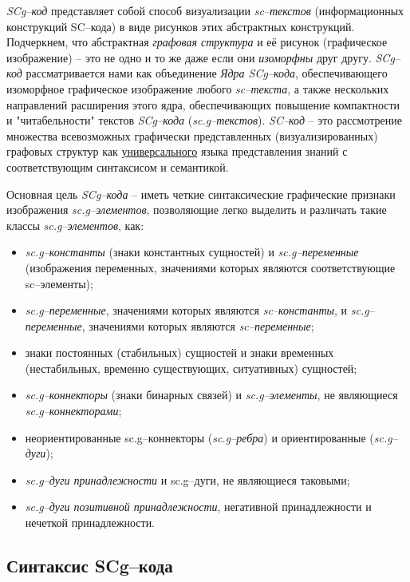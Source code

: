 \textit{SCg--код} представляет собой способ визуализации \textit{sc--текстов} (информационных конструкций SC--кода) в виде рисунков этих абстрактных конструкций. Подчеркнем, что абстрактная \textit{графовая структура} и её рисунок (графическое изображение) -- это не одно и то же даже если они \textit{изоморфны} друг другу. \mbox{\textit{SCg--код}} рассматривается нами как объединение \textit{Ядра SCg--кода}, обеспечивающего изоморфное графическое изображение любого \textit{sc--текста}, а также нескольких направлений расширения этого ядра, обеспечивающих повышение компактности и "читабельности"{} текстов \textit{SCg--кода} (\textit{sc.g--текстов}).
\textit{SC--код} -- это рассмотрение множества всевозможных графически представленных (визуализированных) графовых структур как \underline{универсального} языка представления знаний с соответствующим синтаксисом и семантикой.

Основная цель \textit{SCg--кода} – иметь четкие синтаксические графические признаки изображения \textit{sc.g--элементов}, позволяющие легко выделить и различать такие классы \textit{sc.g--элементов}, как:
\begin{itemize}
	\item \textit{sc.g--константы} (знаки константных сущностей) и \textit{sc.g--переменные} (изображения переменных, значениями которых являются соответствующие sc--элементы);
	\item \textit{sc.g--переменные}, значениями которых являются \textit{sc--константы}, и \textit{sc.g--переменные}, значениями которых являются \textit{sc--переменные};
	\item знаки постоянных (стабильных) сущностей и знаки временных (нестабильных, временно существующих, ситуативных) сущностей;
	\item \textit{sc.g--коннекторы} (знаки бинарных связей) и \textit{sc.g--элементы}, не являющиеся \textit{sc.g--коннекторами};
	\item неориентированные sc.g--коннекторы (\textit{sc.g--ребра}) и ориентированные (\textit{sc.g--дуги});
	\item \textit{sc.g--дуги принадлежности} и sc.g--дуги, не являющиеся таковыми;
	\item \textit{sc.g--дуги позитивной принадлежности}, негативной принадлежности и нечеткой принадлежности.
\end{itemize}


\subsection{Синтаксис SCg--кода}

